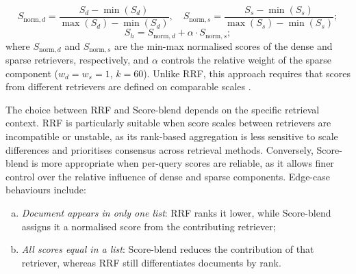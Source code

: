 \begin{spacing}{1.5}
\begin{itemize}
\begin{itemize}
\[
S_{\text{norm},d} = \frac{S_d - \min(S_d)}{\max(S_d) - \min(S_d)}, \quad  
S_{\text{norm},s} = \frac{S_s - \min(S_s)}{\max(S_s) - \min(S_s)} 
;\]
\[
S_h = S_{\text{norm},d} + \alpha \cdot S_{\text{norm},s} ;
\]
where $S_{\text{norm},d}$ and $S_{\text{norm},s}$ are the min-max normalised scores of the dense and sparse retrievers, respectively, and $\alpha$ controls the relative weight of the sparse component ($w_d = w_s = 1$, $k = 60$). Unlike RRF, this approach requires that scores from different retrievers are defined on comparable scales \parencite{wang_searching_2024}.
\end{itemize}
\end{itemize}



\vspace{1em}

The choice between RRF and Score-blend depends on the specific retrieval context. RRF is particularly suitable when score scales between retrievers are incompatible or unstable, as its rank-based aggregation is less sensitive to scale differences and prioritises consensus across retrieval methods. Conversely, Score-blend is more appropriate when per-query scores are reliable, as it allows finer control over the relative influence of dense and sparse components. Edge-case behaviours include: 
\begin{enumerate}[(a)] 
\item \textit{Document appears in only one list}: RRF ranks it lower, while Score-blend assigns it a normalised score from the contributing retriever;
\item \textit{All scores equal in a list}: Score-blend reduces the contribution of that retriever, whereas RRF still differentiates documents by rank.
\end{enumerate}



\end{spacing}
